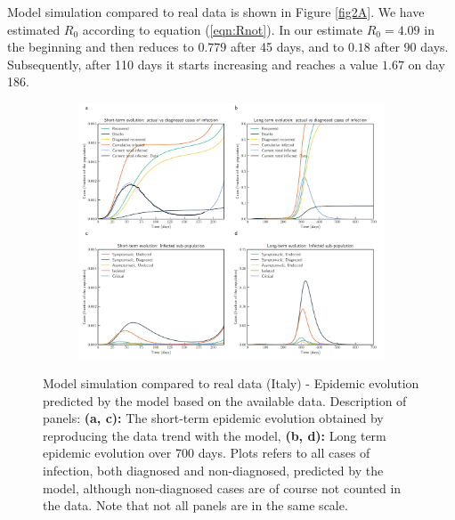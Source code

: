 \documentclass[fleqn,10pt]{wlscirep}
\begin{document}
Model simulation compared to real data is shown in Figure \ref{fig2A}. We have estimated $R_0$ according to equation (\ref*{eqn:Rnot}). In our estimate $R_0 = 4.09$ in the beginning and then reduces to $0.779$ after 45 days, and to $0.18$ after 90 days. Subsequently, after 110 days it starts increasing and reaches a value $1.67$ on day 186.
%
\begin{figure}[t!]
	\centering
	\begin{subfigure}[b]{\textwidth}
		\centering
		\includegraphics[width=\linewidth]{Italy_evolution.pdf}
	\end{subfigure}
	\caption{Model simulation compared to real data (Italy) - Epidemic evolution predicted by the model based on the available data. Description of panels: \textbf{(a, c):} The short-term epidemic evolution obtained by reproducing the data trend with the model, \textbf{(b, d):} Long term epidemic evolution over 700 days. Plots refers to all cases of infection, both diagnosed and non-diagnosed, predicted by the model, although non-diagnosed cases are of course not counted in the data. Note that not all panels are in the same scale.}
	\label{fig2B} 
\end{figure}
%
\end{document}
